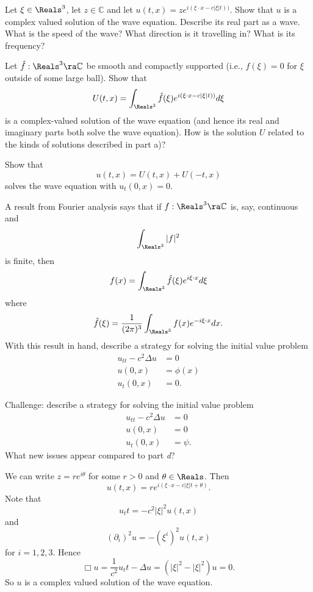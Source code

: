 \documentclass[minion]{homework}
\def\Cplx{\mathbb{C}}
\begin{document}
\begin{aproblems}
\hproblem   
\begin{subproblems}
\item Let $\xi\in\Reals^3$, let $z\in\Cplx$ and let $u(t,x)=ze^{i(\xi\cdot x - c|\xi|t) )}$.
Show that $u$ is a complex valued solution of the wave equation.  Describe its
real part as a wave.  What is the speed of the wave? What direction is it travelling in? What is
its frequency?
\item Let $\hat f:\Reals^3\ra \Cplx$ be smooth and compactly supported (i.e., $f(\xi)=0$ for $\xi$
outside of some large ball). Show that
$$
U(t,x)=\int_{\Reals^3} \hat f(\xi) e^{i(\xi\cdot x - c|\xi|t) )} d\xi
$$
is a complex-valued solution of the wave equation (and hence its real and imaginary parts
both solve the wave equation).  How is the solution $U$ related to the kinds of solutions
described in part a)?
\item
Show that
\begin{equation}
u(t,x) = U(t,x) + U(-t,x)
\end{equation}
solves the wave equation with $u_t(0,x)=0$.
\item A result from Fourier analysis says that if $f:\Reals^3\ra \Cplx$
is, say, continuous and
\begin{equation}
\int_{\Reals^3} |f|^2
\end{equation}
is finite, then
\begin{equation}
f(x) =  \int_{\Reals^3} \hat f(\xi) e^{i\xi\cdot x } d\xi
\end{equation}
where
\begin{equation}
\hat f(\xi) = \frac{1}{(2\pi)^3} \int_{\Reals^3} f(x) e^{-i\xi\cdot x } dx.
\end{equation}
With this result in hand, describe a strategy for solving the initial value problem
\begin{align*}
u_{tt}-c^2\Delta u &= 0\\
u(0,x) &= \phi(x)\\
u_t(0,x) &= 0.
\end{align*}
\item Challenge: describe a strategy for solving the initial value problem
\begin{align*}
u_{tt}-c^2\Delta u &= 0\\
u(0,x) &= 0\\
u_t(0,x) &= \psi.
\end{align*}
What new issues appear compared to part \emph{d}?
\end{subproblems}
\solution
\subsol
We can write $z=re^{i\theta}$ for some $r>0$ and $\theta\in\Reals$.  Then
\[
u(t,x) = r e^{i(\xi \cdot x - c|\xi|t + \theta)}.
\]
Note that
\[
u_tt = -c^2|\xi|^2 u(t,x)
\]
and
\[
(\partial_i)^2 u = -(\xi^i)^2 u(t,x)
\]
for $i=1,2,3$.
Hence
\[
\Box u = \frac{1}{c^2} u_tt - \Delta u = (|\xi|^2-|\xi|^2) u = 0.
\]
So $u$ is a complex valued solution of the wave equation.


\end{aproblems}
\end{document}
